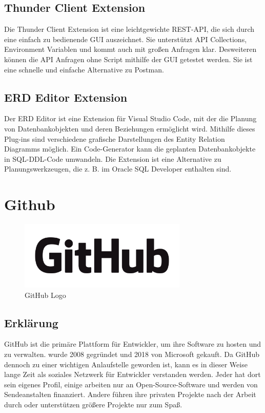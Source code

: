 \subsection{Thunder Client Extension}
Die Thunder Client Extension ist eine leichtgewichte REST-API, die sich durch eine einfach zu bedienende GUI auszeichnet.
Sie unterstützt API Collections, Environment Variablen und kommt auch mit großen Anfragen klar. Desweiteren können die API Anfragen 
ohne Script mithilfe der GUI getestet werden. Sie ist eine schnelle und einfache Alternative zu Postman.

\subsection{ERD Editor Extension}
Der ERD Editor ist eine Extension für Visual Studio Code, mit der die Planung von Datenbankobjekten und deren 
Beziehungen ermöglicht wird. Mithilfe dieses Plug-ins sind verschiedene grafische Darstellungen des Entity Relation Diagramms möglich.
Ein Code-Generator kann die geplanten Datenbankobjekte in SQL-DDL-Code umwandeln. Die Extension ist eine Alternative zu Planungswerkzeugen, 
die z. B. im Oracle SQL Developer enthalten sind.
\newpage

\section{Github}
\cite{GitHub}
\begin{figure}[h]
    \begin{center}
        \includegraphics*[width=8cm]{pics/GitHub_Logo.png}
        \caption[GitHub Logo]{GitHub Logo \cite{GithubLogo}}
    \end{center}
\end{figure}
\subsection*{Erklärung}
GitHub ist die primäre Plattform für Entwickler, um ihre Software zu hosten 
und zu verwalten. wurde 2008 gegründet und 2018 von Microsoft gekauft. 
Da GitHub dennoch zu einer wichtigen Anlaufstelle geworden ist, 
kann es in dieser Weise lange Zeit als soziales Netzwerk für Entwickler 
verstanden werden. Jeder hat dort sein eigenes Profil, einige arbeiten 
nur an Open-Source-Software und werden von Sendeanstalten finanziert. 
Andere führen ihre privaten Projekte nach der Arbeit durch oder unterstützen 
größere Projekte nur zum Spaß.
